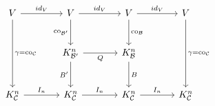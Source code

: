 \documentclass{article}
\begin{document}
\[
\begin{tikzcd}[row sep=large, column sep=large]
    V \arrow[r, "id_V"] \arrow[dd, "\gamma = \operatorname{co}_{\mathcal{C}}"] & V \arrow[r, "id_V"] \arrow[d, "\operatorname{co}_{\mathcal{B}'}"'] & V \arrow[d, "\operatorname{co}_{\mathcal{B}}"] \arrow[r, "id_V"] & V  \arrow[dd,"\gamma = \operatorname{co}_{\mathcal{C}}"] \\
    & K^n_{\mathcal{B}'} \arrow[r, "Q"'] \arrow[d, "B'"'] & K^n_{\mathcal{B}} \arrow[d, "B"] & \\
    K^n_{\mathcal{C}} \arrow[r, "I_n"] & K^n_{\mathcal{C}} \arrow[r, "I_n"] & K^n_{\mathcal{C}} \arrow[r, "I_n"] & K^n_{\mathcal{C}}
\end{tikzcd}
\]
\end{document}
